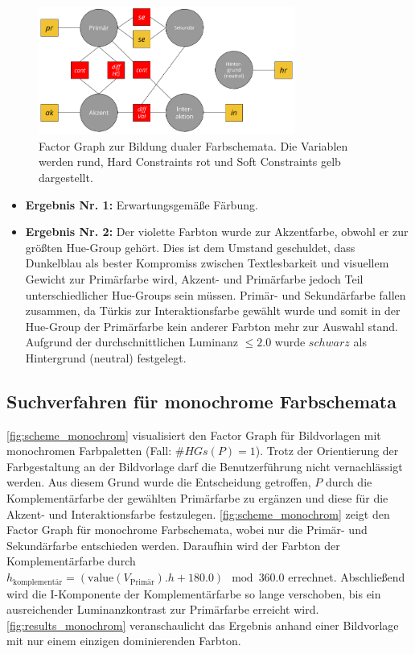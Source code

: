  \begin{figure}[h]
\centering
\includegraphics[width=0.75\textwidth]{img/scheme_dual.png}
\caption{Factor Graph zur Bildung dualer Farbschemata. Die Variablen werden rund, Hard Constraints rot und Soft Constraints gelb dargestellt.}
\label{fig:scheme_dual}
\end{figure}

 
 \begin{itemize}
	\item \textbf{Ergebnis Nr. 1:} Erwartungsgemäße Färbung.
	\item \textbf{Ergebnis Nr. 2:} Der violette Farbton wurde zur Akzentfarbe, obwohl er zur größten Hue-Group gehört. Dies ist dem Umstand geschuldet, dass Dunkelblau als bester Kompromiss zwischen Textlesbarkeit und visuellem Gewicht zur Primärfarbe wird, Akzent- und Primärfarbe jedoch Teil unterschiedlicher Hue-Groups sein müssen. Primär- und Sekundärfarbe fallen zusammen, da Türkis zur Interaktionsfarbe gewählt wurde und somit in der Hue-Group der Primärfarbe kein anderer Farbton mehr zur Auswahl stand. Aufgrund der durchschnittlichen Luminanz $\leq 2.0$ wurde $schwarz$ als Hintergrund (neutral) festgelegt.
\end{itemize}
 
\subsection{Suchverfahren für monochrome Farbschemata}
\label{sec:monochrome}

\autoref{fig:scheme_monochrom} visualisiert den Factor Graph für Bildvorlagen mit monochromen Farbpaletten (Fall: $\#HGs(P) = 1$). Trotz der Orientierung der Farbgestaltung an der Bildvorlage darf die Benutzerführung nicht vernachlässigt werden. Aus diesem Grund wurde die Entscheidung getroffen, $P$ durch die Komplementärfarbe der gewählten Primärfarbe zu ergänzen und diese für die Akzent- und Interaktionsfarbe festzulegen. \autoref{fig:scheme_monochrom} zeigt den Factor Graph für monochrome Farbschemata, wobei nur die Primär- und Sekundärfarbe entschieden werden. Daraufhin wird der Farbton der Komplementärfarbe durch $h_\text{komplementär} = (\text{value}(V_\text{Primär}).h + 180.0) \mod 360.0$ errechnet. Abschließend wird die I-Komponente der Komplementärfarbe so lange verschoben, bis ein ausreichender Luminanzkontrast zur Primärfarbe erreicht wird. \autoref{fig:results_monochrom} veranschaulicht das Ergebnis anhand einer Bildvorlage mit nur einem einzigen dominierenden Farbton.

